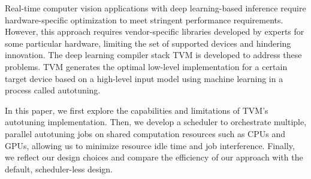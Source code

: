 Real-time computer vision applications with deep learning-based inference require hardware-specific optimization to meet stringent performance requirements. However, this approach requires vendor-specific libraries developed by experts for some particular hardware, limiting the set of supported devices and hindering innovation. The deep learning compiler stack TVM is developed to address these problems. TVM generates the optimal low-level implementation for a certain target device based on a high-level input model using machine learning in a process called autotuning.

In this paper, we first explore the capabilities and limitations of TVM's autotuning implementation. Then, we develop a scheduler to orchestrate multiple, parallel autotuning jobs on shared computation resources such as CPUs and GPUs, allowing us to minimize resource idle time and job interference. Finally, we reflect our design choices and compare the efficiency of our approach with the default, scheduler-less design.